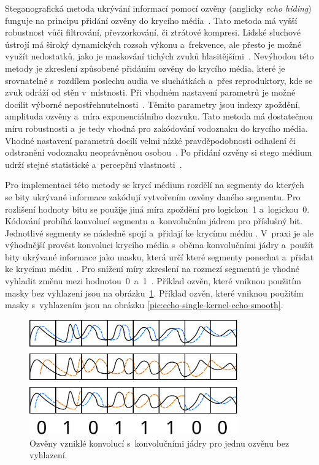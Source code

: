 Steganografická metoda ukrývání informací pomocí ozvěny (anglicky \textit{echo
hiding}) funguje na principu přidání ozvěny do krycího
média~\cite{Djebbar2012}. Tato metoda má vyšší robustnost vůči filtrování,
převzorkování, či ztrátové kompresi. Lidské sluchové ústrojí má široký
dynamických rozsah výkonu a~frekvence, ale přesto je možné využít nedostatků,
jako je maskování tichých zvuků hlasitějšími~\cite{Gruhl1996}. Nevýhodou této
metody je zkreslení způsobené přidáním ozvěny do krycího média, které je
srovnatelné s~rozdílem poslechu audia ve sluchátkách a~přes reproduktory, kde
se zvuk odráží od stěn v~místnosti. Při vhodném nastavení parametrů je možné
docílit výborné nepostřehnutelnosti~\cite{Gruhl1996}. Těmito parametry jsou
indexy zpoždění, amplituda ozvěny a~míra exponenciálního dozvuku. Tato metoda
má dostatečnou míru robustnosti a~je tedy vhodná pro zakódování vodoznaku do
krycího média. Vhodné nastavení parametrů docílí velmi nízké pravděpodobnosti
odhalení či odstranění vodoznaku neoprávněnou osobou~\cite{Gruhl1996}. Po
přidání ozvěny si stego médium udrží stejné statistické a~percepční
vlastnosti~\cite{Djebbar2012}.

Pro implementaci této metody se krycí médium rozdělí na segmenty do kterých se
bity ukrývané informace zakódují vytvořením ozvěny daného segmentu. Pro
rozlišení hodnoty bitu se použije jiná míra zpoždění pro logickou~1
a~logickou~0. Kódování probíhá konvolucí segmentu a~konvolučním jádrem pro
příslušný bit. Jednotlivé segmenty se následně spojí a~přidají ke krycímu médiu
\cite{Gruhl1996}. V~praxi je ale výhodnější provést konvoluci krycího média
s~oběma konvolučními jádry a~použít bity ukrývané informace jako masku, která
určí které segmenty ponechat a~přidat ke krycímu médiu~\cite{Gruhl1996}. Pro
snížení míry zkreslení na rozmezí segmentů je vhodné vyhladit změnu mezi
hodnotou~0~a~1~\cite{Tekeli2017}. Příklad ozvěn, které vniknou použitím masky
bez vyhlazení jsou na obrázku~\ref{pic:echo-single-kernel-echo}. Příklad ozvěn,
které vniknou použitím masky s~vyhlazením jsou na obrázku
\ref{pic:echo-single-kernel-echo-smooth}.

\begin{figure}[hbt]
    \centering
    \includegraphics[width=0.8\textwidth]{obrazky/echo-diagram.pdf}
    \caption{Ozvěny vzniklé konvolucí s~konvolučními jádry pro jednu ozvěnu bez
    vyhlazení.}
    \label{pic:echo-single-kernel-echo}
\end{figure}

